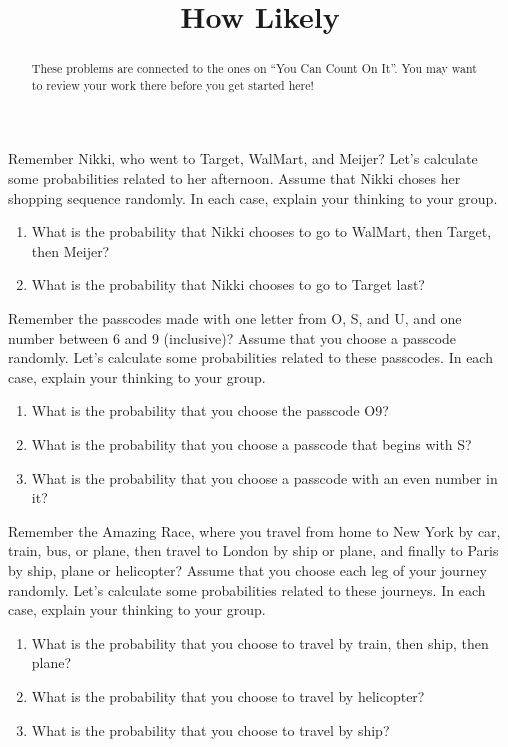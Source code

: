 \documentclass[noauthor,nooutcomes, handout]{ximera}
\title{How Likely}
\begin{document}
\begin{abstract}
These problems are connected to the ones on ``You Can Count On It''. You may want to review your work there before you get started here!
\end{abstract}
\maketitle



\begin{problem}
Remember Nikki, who went to Target, WalMart, and Meijer? Let's calculate some probabilities related to her afternoon. Assume that Nikki choses her shopping sequence randomly. In each case, explain your thinking to your group.

\begin{enumerate}
	\item What is the probability that Nikki chooses to go to WalMart, then Target, then Meijer?
	\item What is the probability that Nikki chooses to go to Target last?
\end{enumerate}
\vfill
\end{problem}

\begin{problem}
Remember the passcodes made with one letter from O, S, and U, and one number between 6 and 9 (inclusive)?
Assume that you choose a passcode randomly. Let's calculate some probabilities related to these passcodes. In each case, explain your thinking to your group.
\begin{enumerate}
	\item What is the probability that you choose the passcode O9?
	\item What is the probability that you choose a passcode that begins with S?
	\item What is the probability that you choose a passcode with an even number in it?
\end{enumerate} \vfill
\end{problem}

\newpage

\begin{problem}
Remember the Amazing Race, where you travel from home to New York by car, train, bus, or plane, then travel to London by ship or plane, and finally to Paris by ship, plane or helicopter? Assume that you choose each leg of your journey randomly. Let's calculate some probabilities related to these journeys. In each case, explain your thinking to your group.
\begin{enumerate}
	\item What is the probability that you choose to travel by train, then ship, then plane?
	\item What is the probability that you choose to travel by helicopter?
	\item What is the probability that you choose to travel by ship?
\end{enumerate} \vfill
\end{problem}
\end{document}
